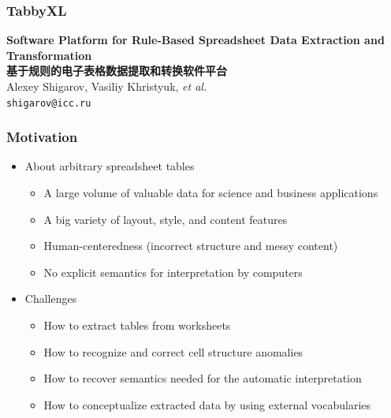 \documentclass[10pt]{beamer}
\begin{document}
\begin{frame}
  \frametitle{Tabby{XL}}
  \vfill
  \begin{center}
    {\bfseries Software Platform for Rule-Based Spreadsheet Data Extraction and Transformation}\\
    {\bfseries 基于规则的电子表格数据提取和转换软件平台}\\
    \medskip
     Alexey Shigarov, Vasiliy Khristyuk, \emph{et al.}\\
    \medskip
    \texttt{shigarov@icc.ru} %
  \end{center}
  \vfill
\end{frame}

\begin{frame}
\frametitle{Motivation}
\begin{itemize}
\item About arbitrary spreadsheet tables
\begin{itemize}
	\item A large volume of valuable data for science and business applications
	\item A big variety of layout, style, and content features
	\item Human-centeredness (incorrect structure and messy content)
	\item No explicit semantics for interpretation by computers
\end{itemize}
\bigskip
\item Challenges
\begin{itemize}
	\item How to extract tables from worksheets
	\item How to recognize and correct cell structure anomalies
	\item How to recover semantics needed for the automatic interpretation
	\item How to conceptualize extracted data by using external vocabularies
\end{itemize}
\end{itemize}
\end{frame}
\end{document}
